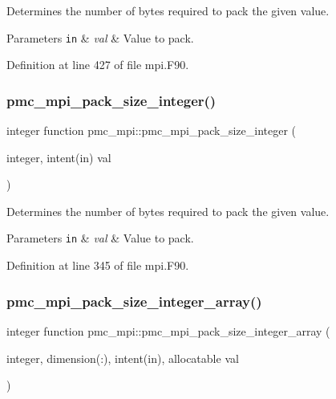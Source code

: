 Determines the number of bytes required to pack the given value. 


\begin{DoxyParams}[1]{Parameters}
\mbox{\tt in}  & {\em val} & Value to pack. \\
\hline
\end{DoxyParams}


Definition at line 427 of file mpi.\+F90.

\mbox{\label{namespacepmc__mpi_a6aecc2f35230f53108b4580ce75afe2d}} 
\subsubsection{\texorpdfstring{pmc\+\_\+mpi\+\_\+pack\+\_\+size\+\_\+integer()}{pmc\_mpi\_pack\_size\_integer()}}
{\footnotesize\ttfamily integer function pmc\+\_\+mpi\+::pmc\+\_\+mpi\+\_\+pack\+\_\+size\+\_\+integer (\begin{DoxyParamCaption}\item[{integer, intent(in)}]{val }\end{DoxyParamCaption})}



Determines the number of bytes required to pack the given value. 


\begin{DoxyParams}[1]{Parameters}
\mbox{\tt in}  & {\em val} & Value to pack. \\
\hline
\end{DoxyParams}


Definition at line 345 of file mpi.\+F90.

\mbox{\label{namespacepmc__mpi_a9e1a99bb575c905e2694fbece029efc1}} 
\subsubsection{\texorpdfstring{pmc\+\_\+mpi\+\_\+pack\+\_\+size\+\_\+integer\+\_\+array()}{pmc\_mpi\_pack\_size\_integer\_array()}}
{\footnotesize\ttfamily integer function pmc\+\_\+mpi\+::pmc\+\_\+mpi\+\_\+pack\+\_\+size\+\_\+integer\+\_\+array (\begin{DoxyParamCaption}\item[{integer, dimension(\+:), intent(in), allocatable}]{val }\end{DoxyParamCaption})}



